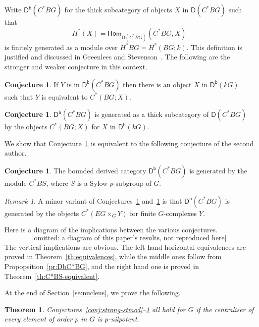 \documentclass[12pt]{amsart}
\newcommand{\DD}{\mathsf{D}}%
\newcommand{\Db}{\DD^{\mathsf{b}}}%
\newcommand{\Hom}{\mathsf{Hom}}
\newcommand{\kG}{\kk G}
\newcommand{\kk}{k}
\numberwithin{equation}{section}
\theoremstyle{plain}
\newtheorem{theorem}[equation]{Theorem}
\theoremstyle{definition}
\newtheorem{conjecture}[equation]{Conjecture}
\theoremstyle{remark}
\newtheorem{remark}[equation]{Remark}
\begin{document}
Write $\Db(C^*BG)$ for the thick subcategory of objects $X$ in
$\DD(C^*BG)$ such that
\[ H^*(X)=\Hom_{\DD(C^*BG)}(C^*BG,X) \] 
is finitely generated as a module over $H^*BG=H^*(BG;\kk)$. This
definition is justified and discussed in Greenlees and
Stevenson~\cite{Greenlees/Stevenson:2020a}. The following are the
stronger and weaker conjecture in this context.


\begin{conjecture}\label{conj:strong-DC}
If $Y$ is in $\Db(C^*BG)$ then there is an object $X$ in $\Db(\kG)$
such that $Y$ is equivalent to $C^*(BG;X)$.
\end{conjecture}


\begin{conjecture}\label{conj:weak-DC}
$\Db(C^*BG)$ is generated as a thick subcategory of $\DD(C^*BG)$ by the objects
$C^*(BG;X)$ for $X$ in $\Db(\kG)$.
\end{conjecture}


We show that Conjecture~\ref{conj:weak-DC} is equivalent to
the following conjecture of the second author.

\begin{conjecture}\label{conj:C*BS}
The bounded derived category $\Db(C^*BG)$ is generated by the
module $C^*BS$, where $S$ is a Sylow $p$-subgroup of $G$.
\end{conjecture}


\begin{remark}
A minor variant of Conjectures~\ref{conj:weak-DC} and~\ref{conj:C*BS}
is that $\Db(C^*BG)$ 
is generated by the objects $C^*(EG\times_G Y)$ for finite
$G$-complexes $Y$.
\end{remark}



Here is a diagram of the implications between the various conjectures.
\[ \mbox{[omitted: a diagram of this paper's results, not reproduced here]} \]
The vertical implications are obvious. The left hand horizontal equivalences are
proved in Theorem~\ref{th:equivalences}, while the middle ones
follow from Propopsition~\ref{pr:DbC*BG}, and the right hand one is
proved in Theorem~\ref{th:C*BS-equivalent}.

At the end of
Section~\ref{se:nucleus}, we prove the  following.

\begin{theorem}\label{th:C*BS-nonucleus}
  Conjectures~\ref{conj:strong-stmod}--\ref{conj:C*BS} all
  hold for $G$ if the centraliser of every element
  of order $p$ in $G$ is $p$-nilpotent.
\end{theorem}
\end{document}
